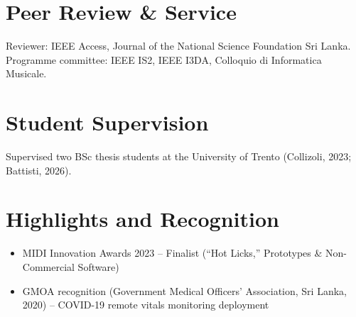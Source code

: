 \documentclass[11pt]{article}
\begin{document}
\section*{Peer Review \& Service}
Reviewer: IEEE Access, Journal of the National Science Foundation Sri Lanka. Programme committee: IEEE IS2, IEEE I3DA, Colloquio di Informatica Musicale.

\enlargethispage{4\baselineskip}
\section*{Student Supervision}
Supervised two BSc thesis students at the University of Trento (Collizoli, 2023; Battisti, 2026).

\section*{Highlights and Recognition}
\begin{itemize}[leftmargin=1.5em, itemsep=-0.2em]
    \item MIDI Innovation Awards 2023 -- Finalist (``Hot Licks,'' Prototypes \& Non-Commercial Software)
    \item GMOA recognition (Government Medical Officers' Association, Sri Lanka, 2020) -- COVID-19 remote vitals monitoring deployment
\end{itemize}
\end{document}

